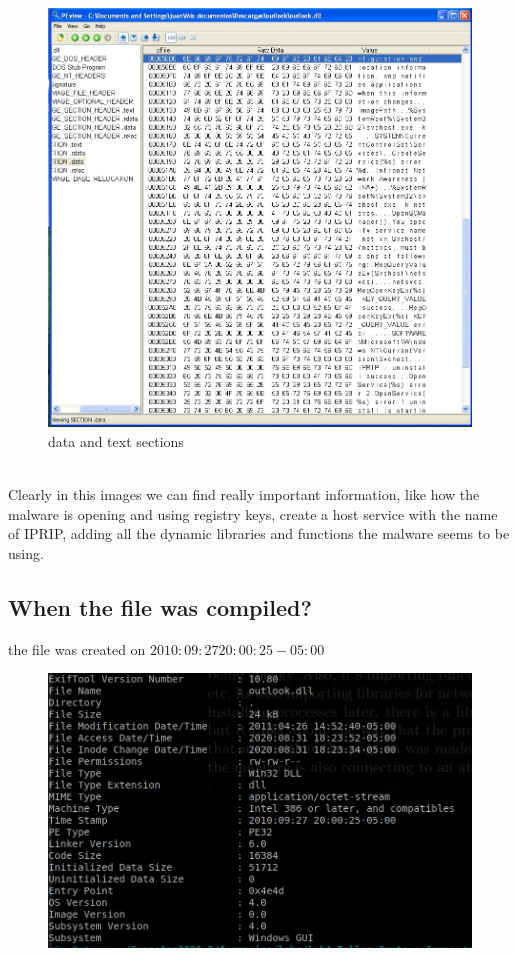 \documentclass[12pt,letter]{article} %
\begin{document}
		\begin{figure}[h!]
			\centering
			\includegraphics[scale=0.28]{img3.jpeg}
			\caption{data and text sections}
			\label{5}
		\end{figure}$ $
		\pagebreak$ $\\
		Clearly in this images we can find really important information, like how the malware is opening and using registry keys, create a host service with the name of IPRIP, adding all the dynamic libraries and functions the malware seems to be using.
        \subsection{When the file was compiled?}
            the file was created on $ 2010:09:27 20:00:25-05:00  $
            \begin{figure}[h!]
            \includegraphics[width=0.8\linewidth]{exif.png}
            \end{figure}
\end{document}
